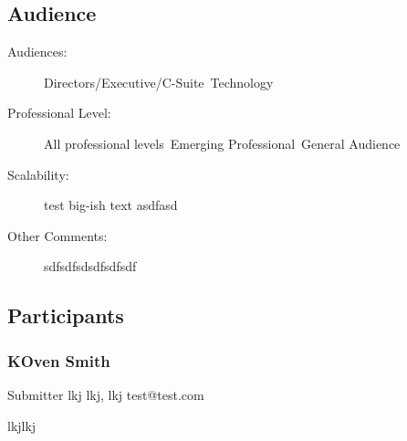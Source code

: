 \documentclass{report}
\begin{document}
              \subsection*{Audience}
                \begin{description}
                  \item [Audiences:]Directors/Executive/C-Suite~Technology~
                  \item[Professional Level:]All professional levels~Emerging Professional~General Audience~
                \item[Scalability:]  test
 big-ish text
asdfasd

							
              \item[Other Comments:] sdfsdfsdsdfsdfsdf
              \end{description}
            \subsection*{Participants}
              \subsubsection*{ KOven Smith }
              Submitter\newline
              lkj\newline
              lkj, lkj
              \newline
              test@test.com\newline
              
              lkjlkj\newline

              


              

              

              

              

              
        
\end{document}
